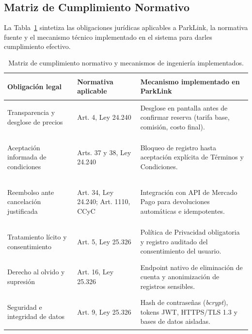 \subsection{Matriz de Cumplimiento Normativo}

La Tabla~\ref{tab:matriz_legal} sintetiza las obligaciones jurídicas aplicables a ParkLink, la normativa fuente y el mecanismo técnico implementado en el sistema para darles cumplimiento efectivo.

\vspace{0.3cm}

\begin{table}[H]
\centering
\renewcommand{\arraystretch}{1.5}
\small
\begin{tabularx}{\textwidth}{>{\bfseries\raggedright\arraybackslash}p{3.2cm} >{\raggedright\arraybackslash}p{3.8cm} >{\raggedright\arraybackslash}X}
\toprule
\textbf{Obligación legal} & \textbf{Normativa aplicable} & \textbf{Mecanismo implementado en ParkLink} \\
\midrule
Transparencia y desglose de precios & Art. 4, Ley 24.240 \autocite{ley24240} & Desglose en pantalla antes de confirmar reserva (tarifa base, comisión, costo final). \\
\rowcolor{plgray}
Aceptación informada de condiciones & Arts. 37 y 38, Ley 24.240 \autocite{ley24240} & Bloqueo de registro hasta aceptación explícita de Términos y Condiciones. \\
Reembolso ante cancelación justificada & Art. 34, Ley 24.240; Art. 1110, CCyC \autocite{cicc_argentina} & Integración con API de Mercado Pago para devoluciones automáticas e idempotentes. \\
\rowcolor{plgray}
Tratamiento lícito y consentimiento & Art. 5, Ley 25.326 \autocite{ley25326} & Política de Privacidad obligatoria y registro auditado del consentimiento del usuario. \\
Derecho al olvido y supresión & Art. 16, Ley 25.326 \autocite{ley25326} & Endpoint nativo de eliminación de cuenta y anonimización de registros sensibles. \\
\rowcolor{plgray}
Seguridad e integridad de datos & Art. 9, Ley 25.326 \autocite{ley25326} & Hash de contraseñas (\textit{bcrypt}), tokens JWT, HTTPS/TLS 1.3 y bases de datos aisladas. \\
\bottomrule
\end{tabularx}
\caption{Matriz de cumplimiento normativo y mecanismos de ingeniería implementados.}
\label{tab:matriz_legal}
\end{table}
